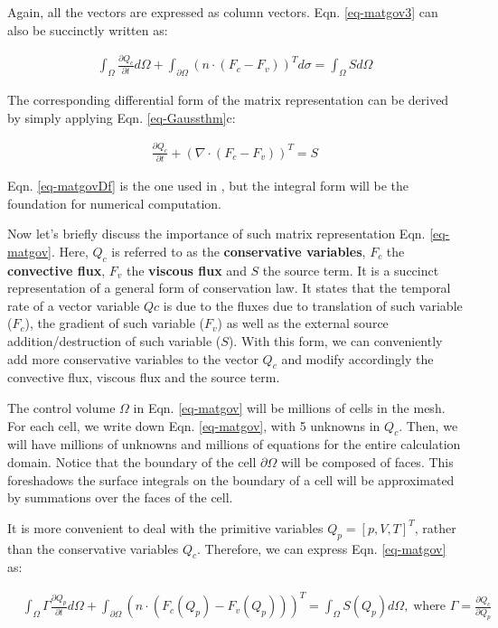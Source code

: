 \documentclass[11pt, letterpaper]{report}
\begin{document}
Again, all the vectors are expressed as column vectors. Eqn. \ref{eq-matgov3} can also be succinctly
written as:

\begin{align}\label{eq-matgov}
   \int_{\Omega}\frac{\partial Q_c}{\partial t}d\Omega +  \int_{\partial \Omega} (n \cdot (F_c -
   F_v))^T d\sigma = \int_{\Omega} S d\Omega
\end{align}

The corresponding differential form of the matrix representation can be derived by simply applying
Eqn. \ref{eq-Gaussthm}c:

\begin{align}\label{eq-matgovDf}
   \frac{\partial Q_c}{\partial t} + (\nabla \cdot (F_c - F_v))^T = S
\end{align}

Eqn. \ref{eq-matgovDf} is the one used in \cite{li2006unified}, but the integral form will be the
foundation for numerical computation. \paraspace 

Now let's briefly discuss the importance of such matrix representation Eqn. \ref{eq-matgov}. Here,
$Q_c$ is referred to as the {\bf conservative variables}, $F_c$ the {\bf convective flux}, $F_v$ the
{\bf viscous flux} and $S$ the source term. It is a succinct representation of a general form of
conservation law. It states that the temporal rate of a vector variable $Qc$  is due to the fluxes
due to translation of such variable ($F_c$), the gradient of such variable ($F_v$) as well as the
external source addition/destruction of such variable ($S$). With this form, we can conveniently add
more conservative variables to the vector $Q_c$ and modify accordingly the convective flux, viscous
flux and the source term. \paraspace

The control volume $\Omega$ in Eqn. \ref{eq-matgov} will be millions of cells in the mesh. For each
cell, we write down Eqn. \ref{eq-matgov}, with 5 unknowns in $Q_c$. Then, we will have millions of
unknowns and millions of equations for the entire calculation domain. Notice that the boundary of
the cell $\partial \Omega$ will be composed of faces. This foreshadows the surface integrals on the
boundary of a cell will be approximated by summations over the faces of the cell. \paraspace

It is more convenient to deal with the primitive variables $Q_p = [p, V, T]^T$, rather than the
conservative variables $Q_c$. Therefore, we can express Eqn. \ref{eq-matgov} as:

\begin{align*}
   &\int_{\Omega}\Gamma \frac{\partial Q_p}{\partial t}d\Omega + \int_{\partial \Omega} (n \cdot
   (F_c(Q_p) - F_v(Q_p)))^T = \int_{\Omega} S(Q_p) d\Omega, \; \textrm{where }\Gamma = \frac{\partial Q_c}{\partial Q_p}
\end{align*}
\end{document}
